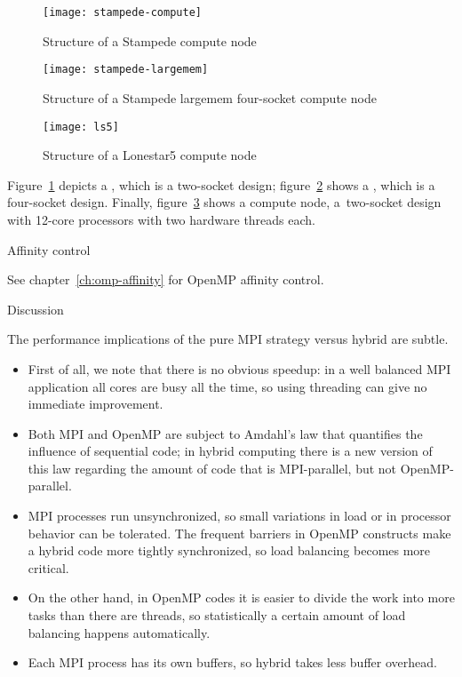 \begin{figure}[ht]
  \texttt{[image: stampede-compute]}
  \caption{Structure of a Stampede compute node}
  \label{fig:stampede-compute-hwloc}
\end{figure}

\begin{figure}[p]
  \texttt{[image: stampede-largemem]}
  \caption{Structure of a Stampede largemem four-socket compute node}
  \label{fig:stampede-largemem-hwloc}
\end{figure}

\begin{figure}[ht]
  \texttt{[image: ls5]}
  \caption{Structure of a Lonestar5 compute node}
  \label{fig:ls5-compute-hwloc}
\end{figure}

Figure~\ref{fig:stampede-compute-hwloc} depicts a
, which is a two-socket
 design;
figure~\ref{fig:stampede-largemem-hwloc} shows a 
, which is a four-socket design.
%
Finally, figure~\ref{fig:ls5-compute-hwloc} shows a
 compute node, a~two-socket design with 12-core
 processors with two hardware threads
each.

 {Affinity control}

See chapter~\ref{ch:omp-affinity} for OpenMP affinity control.


 {Discussion}

The performance implications of the pure MPI strategy versus hybrid
are subtle.
\begin{itemize}
\item First of all, we note that there is no obvious speedup: in a
  well balanced MPI application all cores are busy all the time, so
  using threading can give no immediate improvement.
\item Both MPI and OpenMP are subject to Amdahl's law that quantifies
  the influence of sequential code; in hybrid computing there is a new
  version of this law regarding the amount of code that is
  MPI-parallel, but not OpenMP-parallel.
\item MPI processes run unsynchronized, so small variations in load or
  in processor behavior can be tolerated. The frequent barriers in
  OpenMP constructs make a hybrid code more tightly synchronized, so
  load balancing becomes more critical.
\item On the other hand, in OpenMP codes it is easier to divide the
  work into more tasks than there are threads, so statistically a
  certain amount of load balancing happens automatically.
\item Each MPI process has its own buffers, so hybrid takes less
  buffer overhead.
\end{itemize}

